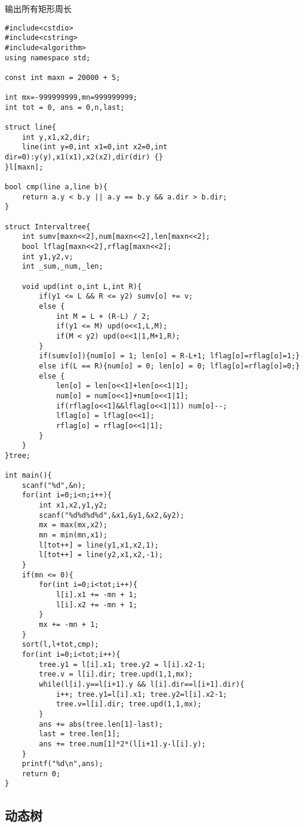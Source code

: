 \documentclass[UTF8]{ctexart}
\begin{document}
输出所有矩形周长
\begin{framed}
\begin{lstlisting}
#include<cstdio>
#include<cstring>
#include<algorithm>
using namespace std;

const int maxn = 20000 + 5;

int mx=-999999999,mn=999999999;
int tot = 0, ans = 0,n,last;

struct line{
    int y,x1,x2,dir;
    line(int y=0,int x1=0,int x2=0,int dir=0):y(y),x1(x1),x2(x2),dir(dir) {}
}l[maxn];

bool cmp(line a,line b){
    return a.y < b.y || a.y == b.y && a.dir > b.dir;
}

struct Intervaltree{
    int sumv[maxn<<2],num[maxn<<2],len[maxn<<2];
    bool lflag[maxn<<2],rflag[maxn<<2];
    int y1,y2,v;
    int _sum,_num,_len;
    
    void upd(int o,int L,int R){
        if(y1 <= L && R <= y2) sumv[o] += v;
        else {
            int M = L + (R-L) / 2;
            if(y1 <= M) upd(o<<1,L,M);
            if(M < y2) upd(o<<1|1,M+1,R);
        }
        if(sumv[o]){num[o] = 1; len[o] = R-L+1; lflag[o]=rflag[o]=1;}
        else if(L == R){num[o] = 0; len[o] = 0; lflag[o]=rflag[o]=0;}
        else {
            len[o] = len[o<<1]+len[o<<1|1];
            num[o] = num[o<<1]+num[o<<1|1];
            if(rflag[o<<1]&&lflag[o<<1|1]) num[o]--;
            lflag[o] = lflag[o<<1];
            rflag[o] = rflag[o<<1|1];
        }
    }
}tree;

int main(){
    scanf("%d",&n);
    for(int i=0;i<n;i++){
        int x1,x2,y1,y2;
        scanf("%d%d%d%d",&x1,&y1,&x2,&y2);
        mx = max(mx,x2);
        mn = min(mn,x1);
        l[tot++] = line(y1,x1,x2,1); 
        l[tot++] = line(y2,x1,x2,-1);
    }
    if(mn <= 0){
        for(int i=0;i<tot;i++){
            l[i].x1 += -mn + 1;
            l[i].x2 += -mn + 1;
        }
        mx += -mn + 1;
    }
    sort(l,l+tot,cmp);
    for(int i=0;i<tot;i++){
        tree.y1 = l[i].x1; tree.y2 = l[i].x2-1; 
        tree.v = l[i].dir; tree.upd(1,1,mx);
        while(l[i].y==l[i+1].y && l[i].dir==l[i+1].dir){
            i++; tree.y1=l[i].x1; tree.y2=l[i].x2-1;
            tree.v=l[i].dir; tree.upd(1,1,mx);
        }
        ans += abs(tree.len[1]-last);
        last = tree.len[1];
        ans += tree.num[1]*2*(l[i+1].y-l[i].y);
    }
    printf("%d\n",ans);
    return 0;
}
\end{lstlisting}
\end{framed}

\subsection{动态树}
\end{document}
